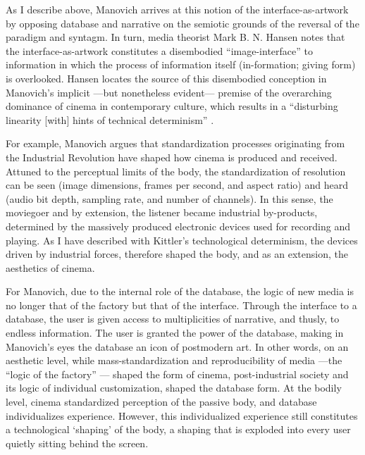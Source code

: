 As I describe above, Manovich arrives at this notion of the interface-as-artwork by opposing database and narrative on the semiotic grounds of the reversal of the paradigm and syntagm. In turn, media theorist Mark B. N. Hansen \parencite{Han04:New} notes that the interface-as-artwork constitutes a disembodied ``image-interface'' to information in which the process of information itself (in-formation; giving form) is overlooked. Hansen locates the source of this disembodied conception in Manovich's implicit ---but nonetheless evident--- premise of the overarching dominance of cinema in contemporary culture, which results in a ``disturbing linearity [with] hints of technical determinism'' \parencite[36]{Han04:New}.

For example, Manovich argues that standardization processes originating from the Industrial Revolution have shaped how cinema is produced and received. Attuned to the perceptual limits of the body, the standardization of resolution can be seen (image dimensions, frames per second, and aspect ratio) and heard (audio bit depth, sampling rate, and number of channels). In this sense, the moviegoer and by extension, the listener became industrial by-products, determined by the massively produced electronic devices used for recording and playing. As I have described with Kittler's technological determinism, the devices driven by industrial forces, therefore shaped the body, and as an extension, the aesthetics of cinema. 

For Manovich, due to the internal role of the database, the logic of new media is no longer that of the factory but that of the interface. Through the interface to a database, the user is given access to multiplicities of narrative, and thusly, to endless information. The user is granted the power of the database, making in Manovich's eyes the database an icon of postmodern art. In other words, on an aesthetic level, while mass-standardization and reproducibility of media ---the ``logic of the factory'' \parencite[30]{Man01:The}--- shaped the form of cinema, post-industrial society and its logic of individual customization, shaped the database form. At the bodily level, cinema standardized perception of the passive body, and database individualizes experience. However, this individualized experience still constitutes a technological `shaping' of the body, a shaping that is exploded into every user quietly sitting behind the screen.

